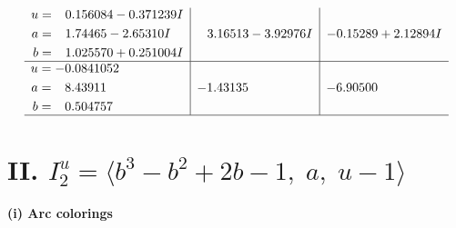 \documentclass[1p]{elsarticle_modified}
\theoremstyle{definition}
\begin{document}
$$\begin{array}{c|c|c}
\begin{aligned}
u &= \phantom{-}0.156084 - 0.371239 I \\
a &= \phantom{-}1.74465 - 2.65310 I \\
b &= \phantom{-}1.025570 + 0.251004 I\end{aligned}
 & \phantom{-}3.16513 - 3.92976 I & -0.15289 + 2.12894 I \\ \hline\begin{aligned}
u &= -0.0841052\phantom{ +0.000000I} \\
a &= \phantom{-}8.43911\phantom{ +0.000000I} \\
b &= \phantom{-}0.504757\phantom{ +0.000000I}\end{aligned}
 & -1.43135\phantom{ +0.000000I} & -6.90500\phantom{ +0.000000I}\\
 \hline 
 \end{array}$$\newpage\newpage\renewcommand{\arraystretch}{1}
\centering \section*{II. $I^u_{2}= \langle b^3- b^2+2 b-1,\;a,\;u-1 \rangle$}
\flushleft \textbf{(i) Arc colorings}\\
\end{document}
